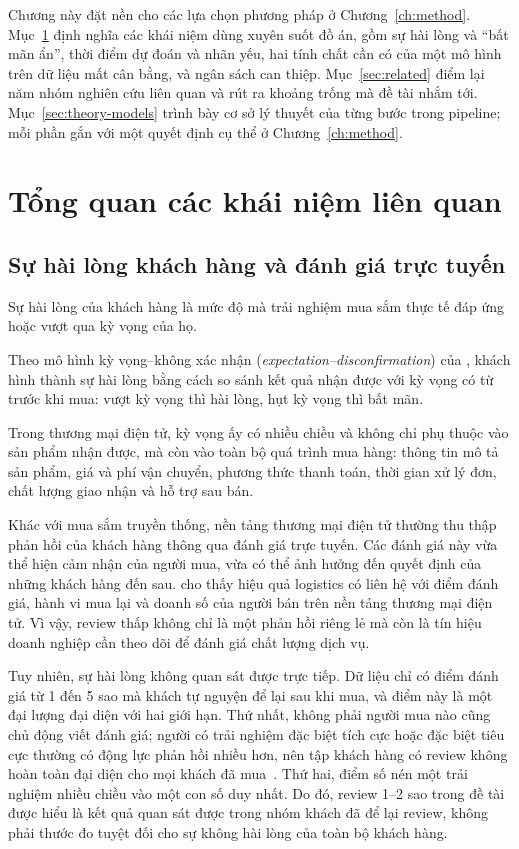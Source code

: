 \documentclass[12pt,a4paper]{report}
\begin{document}
Chương này đặt nền cho các lựa chọn phương pháp ở Chương~\ref{ch:method}. Mục~\ref{sec:concepts} định nghĩa các khái niệm dùng xuyên suốt đồ án, gồm sự hài lòng và ``bất mãn ẩn'', thời điểm dự đoán và nhãn yếu, hai tính chất cần có của một mô hình trên dữ liệu mất cân bằng, và ngân sách can thiệp. Mục~\ref{sec:related} điểm lại năm nhóm nghiên cứu liên quan và rút ra khoảng trống mà đề tài nhắm tới. Mục~\ref{sec:theory-models} trình bày cơ sở lý thuyết của từng bước trong pipeline; mỗi phần gắn với một quyết định cụ thể ở Chương~\ref{ch:method}.

\section{Tổng quan các khái niệm liên quan}\label{sec:concepts}

\subsection{Sự hài lòng khách hàng và đánh giá trực tuyến}\label{sec:con-satisfaction}

Sự hài lòng của khách hàng là mức độ mà trải nghiệm mua sắm thực tế đáp ứng hoặc vượt qua kỳ vọng của họ. {\sloppy Theo mô hình kỳ vọng--không xác nhận (\emph{expectation--\allowbreak disconfirmation}) của \textcite{oliver1980}, khách hình thành sự hài lòng bằng cách so sánh kết quả nhận được với kỳ vọng có từ trước khi mua: vượt kỳ vọng thì hài lòng, hụt kỳ vọng thì bất mãn.\par} Trong thương mại điện tử, kỳ vọng ấy có nhiều chiều và không chỉ phụ thuộc vào sản phẩm nhận được, mà còn vào toàn bộ quá trình mua hàng: thông tin mô tả sản phẩm, giá và phí vận chuyển, phương thức thanh toán, thời gian xử lý đơn, chất lượng giao nhận và hỗ trợ sau bán.

Khác với mua sắm truyền thống, nền tảng thương mại điện tử thường thu thập phản hồi của khách hàng thông qua đánh giá trực tuyến. Các đánh giá này vừa thể hiện cảm nhận của người mua, vừa có thể ảnh hưởng đến quyết định của những khách hàng đến sau. \textcite{deshpande2023} cho thấy hiệu quả logistics có liên hệ với điểm đánh giá, hành vi mua lại và doanh số của người bán trên nền tảng thương mại điện tử. Vì vậy, review thấp không chỉ là một phản hồi riêng lẻ mà còn là tín hiệu doanh nghiệp cần theo dõi để đánh giá chất lượng dịch vụ.

Tuy nhiên, sự hài lòng không quan sát được trực tiếp. Dữ liệu chỉ có điểm đánh giá từ 1 đến 5 sao mà khách tự nguyện để lại sau khi mua, và điểm này là một đại lượng đại diện với hai giới hạn. Thứ nhất, không phải người mua nào cũng chủ động viết đánh giá; người có trải nghiệm đặc biệt tích cực hoặc đặc biệt tiêu cực thường có động lực phản hồi nhiều hơn, nên tập khách hàng có review không hoàn toàn đại diện cho mọi khách đã mua~\parencite{li2008,schoenmueller2020}. Thứ hai, điểm số nén một trải nghiệm nhiều chiều vào một con số duy nhất. Do đó, review 1--2 sao trong đề tài được hiểu là kết quả quan sát được trong nhóm khách đã để lại review, không phải thước đo tuyệt đối cho sự không hài lòng của toàn bộ khách hàng.
\end{document}
